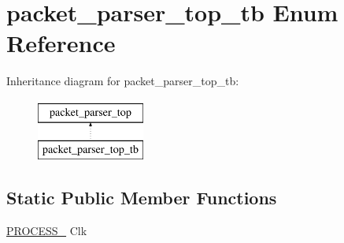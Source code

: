 \hypertarget{enumpacket__parser__top__tb}{}\section{packet\+\_\+parser\+\_\+top\+\_\+tb Enum Reference}
\label{enumpacket__parser__top__tb}
Inheritance diagram for packet\+\_\+parser\+\_\+top\+\_\+tb\+:\begin{figure}[H]
\begin{center}
\leavevmode
\includegraphics[height=2.000000cm]{enumpacket__parser__top__tb}
\end{center}
\end{figure}
\subsection*{Static Public Member Functions}
\begin{DoxyCompactItemize}
\item 
\mbox{\hyperlink{enumpacket__parser__top__tb_a17a60d01357f6cd3aa4f63a218b9eb5d}{P\+R\+O\+C\+E\+S\+S\+\_}} Clk
\end{DoxyCompactItemize}
